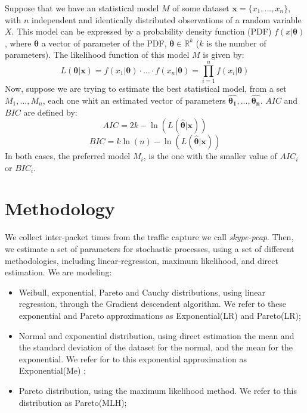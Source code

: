 Suppose that we have an statistical model $M$ of some dataset ${\boldsymbol{x} = \{x_1, ..., x_n}\}$, with $n$ independent and identically distributed observations of a random variable $X$. This model can be expressed by a probability density function (PDF) $f(x| \boldsymbol{\theta})$, where $\boldsymbol{\theta}$ a vector of parameter of the PDF, $\boldsymbol{\theta} \in \mathbb{R}^{k}$ ($k$ is the number of parameters). The  likelihood function  of this model $M$ is given by:
\begin{equation}
L(\boldsymbol{\theta}|\boldsymbol{x} ) =  f(x_1|\boldsymbol{\theta})\cdot...\cdot f(x_n|\boldsymbol{\theta}) = \prod_{i = 1}^{n}f(x_i|\boldsymbol{\theta})
\end{equation}
Now, suppose we are trying to estimate the best statistical model, from a set ${M_1, ..., M_n}$, each one whit an estimated vector of parameters  ${\boldsymbol{\hat{\theta_1}}}, ..., {\boldsymbol{\hat{\theta_n}}}$. $AIC$ and $BIC$ are defined by:
\begin{equation}
AIC = 2k - \ln(L(\boldsymbol{\hat{\theta}}|\boldsymbol{x}))
\end{equation}
\begin{equation}
BIC = k\ln(n) - \ln(L(\boldsymbol{\hat{\theta}}|\boldsymbol{x}))
\end{equation}
In both cases, the preferred model $M_i$, is the one with the smaller value of $AIC_i$ or $BIC_i$.

\section{Methodology}

We collect inter-packet times from the traffic capture we call \textit{skype-pcap}. Then, we estimate a set of parameters for stochastic processes, using a set of different methodologies, including linear-regression, maximum likelihood, and direct estimation. We are modeling: 

\begin{itemize}
 \item Weibull, exponential, Pareto and Cauchy distributions, using linear regression, through the Gradient descendent algorithm. We refer to these exponential and Pareto approximations as Exponential(LR) and Pareto(LR);
    \item Normal and exponential distribution, using direct estimation the mean and the standard deviation of the dataset for the normal, and the mean for the exponential. We refer for to this exponential approximation as Exponential(Me) ;
    \item Pareto distribution, using the maximum likelihood method. We refer to this distribution as Pareto(MLH);
\end{itemize}


